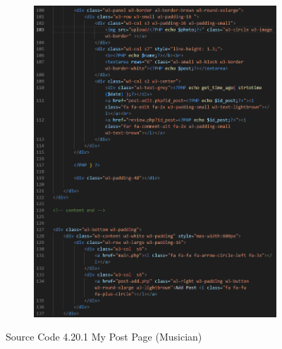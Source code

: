 \begin{enumerate}[1.]
\begin{figure}[h]
\begin{subfigure}[b]{0.6\textwidth}
            \includegraphics[width=\textwidth]{mainmatter/images/frontend/code/mpost2.png}
            \label{fig:sub2}
        \end{subfigure}
        \caption*{Source Code 4.20.1 My Post Page (Musician)}
        \label{fig:myfig59a}
    \end{figure}


\end{enumerate}
